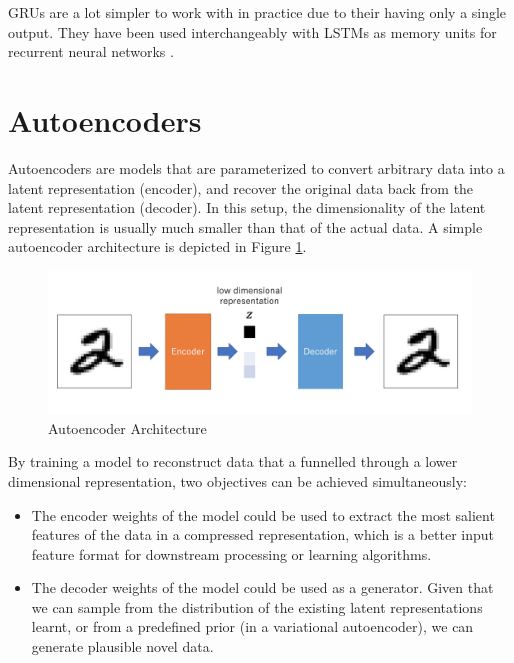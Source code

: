 GRUs are a lot simpler to work with in practice due to their having only a single output. They have been used interchangeably with LSTMs as memory units for recurrent neural networks \citep{chung2015gated,fu2017style}.


\section{Autoencoders}

Autoencoders are models that are parameterized to convert arbitrary data into a latent representation (encoder), and recover the original data back from the latent representation (decoder). In this setup, the dimensionality of the latent representation is usually much smaller than that of the actual data. A simple autoencoder architecture is depicted in Figure \ref{fig:autoencoder-structure}.

\begin{figure}[ht]
	\centering
	\includegraphics[width=\textwidth]{images/autoencoder-structure}
	\caption{\label{fig:autoencoder-structure} Autoencoder Architecture}
\end{figure}

By training a model to reconstruct data that a funnelled through a lower dimensional representation, two objectives can be achieved simultaneously:
\begin{itemize}
	\item The encoder weights of the model could be used to extract the most salient features of the data in a compressed representation, which is a better input feature format for downstream processing or learning algorithms. \citep{hinton2006reducing}
	\item The decoder weights of the model could be used as a generator. Given that we can sample from the distribution of the existing latent representations learnt, or from a predefined prior (in a variational autoencoder), we can generate plausible novel data.
\end{itemize}

